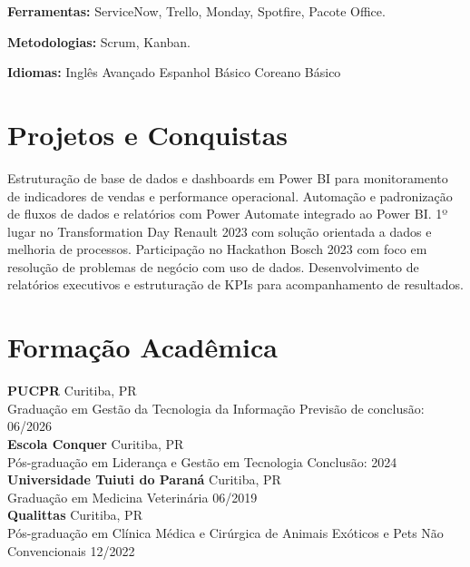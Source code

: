 \documentclass[11pt,a4paper]{article}
\begin{document}
\textbf{Ferramentas:} ServiceNow, Trello, Monday, Spotfire, Pacote Office.

\textbf{Metodologias:} Scrum, Kanban.

\textbf{Idiomas:} Inglês Avançado \enspace\textbullet\enspace Espanhol Básico \enspace\textbullet\enspace Coreano Básico

\section{Projetos e Conquistas}

Estruturação de base de dados e dashboards em Power BI para monitoramento de indicadores de vendas e performance operacional. Automação e padronização de fluxos de dados e relatórios com Power Automate integrado ao Power BI. 1º lugar no Transformation Day Renault 2023 com solução orientada a dados e melhoria de processos. Participação no Hackathon Bosch 2023 com foco em resolução de problemas de negócio com uso de dados. Desenvolvimento de relatórios executivos e estruturação de KPIs para acompanhamento de resultados.

\section{Formação Acadêmica}

\textbf{PUCPR} \hfill Curitiba, PR\\
Graduação em Gestão da Tecnologia da Informação \hfill Previsão de conclusão: 06/2026\\[6pt]

\textbf{Escola Conquer} \hfill Curitiba, PR\\
Pós-graduação em Liderança e Gestão em Tecnologia \hfill Conclusão: 2024\\[6pt]

\textbf{Universidade Tuiuti do Paraná} \hfill Curitiba, PR\\
Graduação em Medicina Veterinária \hfill 06/2019\\[6pt]

\textbf{Qualittas} \hfill Curitiba, PR\\
Pós-graduação em Clínica Médica e Cirúrgica de Animais Exóticos e Pets Não Convencionais \hfill 12/2022
\end{document}
